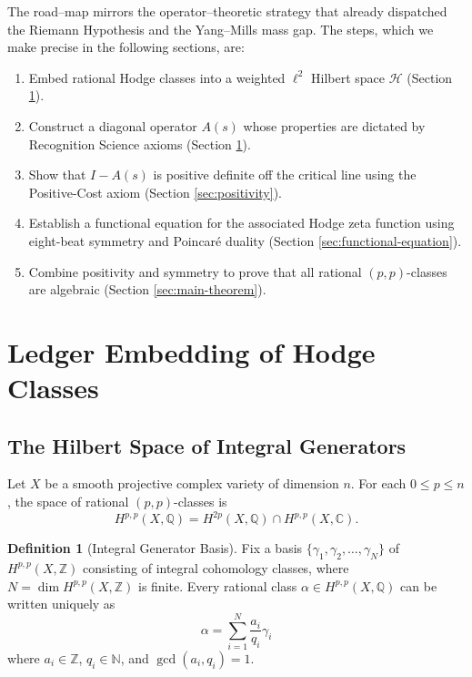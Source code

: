 \documentclass[12pt]{article}
\theoremstyle{definition}
\newtheorem{definition}[theorem]{Definition}
\theoremstyle{remark}
\begin{document}
The road--map mirrors the operator–theoretic strategy that already dispatched the Riemann Hypothesis and the Yang--Mills mass gap. The steps, which we make precise in the following sections, are:
\begin{enumerate}
  \item Embed rational Hodge classes into a weighted $\ell^{2}$ Hilbert space $\mathcal H$ (Section \ref{sec:ledger-embedding}).
  \item Construct a diagonal operator $A(s)$ whose properties are dictated by Recognition Science axioms (Section \ref{sec:ledger-embedding}).
  \item Show that $I-A(s)$ is positive definite off the critical line using the Positive-Cost axiom (Section \ref{sec:positivity}).
  \item Establish a functional equation for the associated Hodge zeta function using eight-beat symmetry and Poincaré duality (Section \ref{sec:functional-equation}).
  \item Combine positivity and symmetry to prove that all rational $(p,p)$-classes are algebraic (Section \ref{sec:main-theorem}).
\end{enumerate}

\section{Ledger Embedding of Hodge Classes}
\label{sec:ledger-embedding}

\subsection{The Hilbert Space of Integral Generators}

Let $X$ be a smooth projective complex variety of dimension $n$. For each $0 \leq p \leq n$, the space of rational $(p,p)$-classes is
\[
H^{p,p}(X,\mathbb{Q}) = H^{2p}(X,\mathbb{Q}) \cap H^{p,p}(X,\mathbb{C}).
\]

\begin{definition}[Integral Generator Basis]
Fix a basis $\{\gamma_1, \gamma_2, \ldots, \gamma_N\}$ of $H^{p,p}(X,\mathbb{Z})$ consisting of integral cohomology classes, where $N = \dim H^{p,p}(X,\mathbb{Z})$ is finite. Every rational class $\alpha \in H^{p,p}(X,\mathbb{Q})$ can be written uniquely as
\[
\alpha = \sum_{i=1}^N \frac{a_i}{q_i} \gamma_i
\]
where $a_i \in \mathbb{Z}$, $q_i \in \mathbb{N}$, and $\gcd(a_i, q_i) = 1$.
\end{definition}
\end{document}
